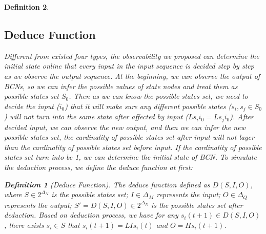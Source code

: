 \documentclass[conference]{IEEEtran} %
\newtheorem{definition}{Definition}
\begin{document}
\begin{definition}
\subsection{Deduce Function}
Different from existed four types, the observability we proposed can determine the initial state online that every input in the input sequence is decided step by step as we observe the output sequence. At the beginning, we can observe the output of {\em BCNs}, so we can infer the possible values of state nodes and treat them as possible states set $S_0$. Then as we can know the possible states set, we need to decide the input ($i_0$) that it will make sure any different possible states ($s_i, s_j \in S_0$) will not turn into the same state after affected by input ($Ls_i i_0=Ls_j i_0$). After decided input, we can observe the new output, and then we can infer the new possible states set, the cardinality of possible states set after input will not lager than the cardinality of possible states set before input. If the cardinality of possible states set turn into be 1, we can determine the initial state of BCN. To simulate the deduction process, we define the deduce function  at first:
\begin{definition}[Deduce Function] The deduce function defined as $D\left(S, I, O\right)$, where $S\in 2^{\Delta_N}$ is the possible states set; $I\in\Delta_M$ represents the input; $O\in\Delta_Q$ represents the output; $S'=D\left(S, I, O\right)\in 2^{\Delta_N}$ is the possible states set after deduction. Based on deduction process, we have for any $s_i(t+1)\in D\left(S, I, O\right)$, there exists $s_i\in S$ that $s_i(t+1)=LIs_i(t)$ and $O=Hs_i(t+1)$.
\end{definition}


\end{definition}
\end{document}
